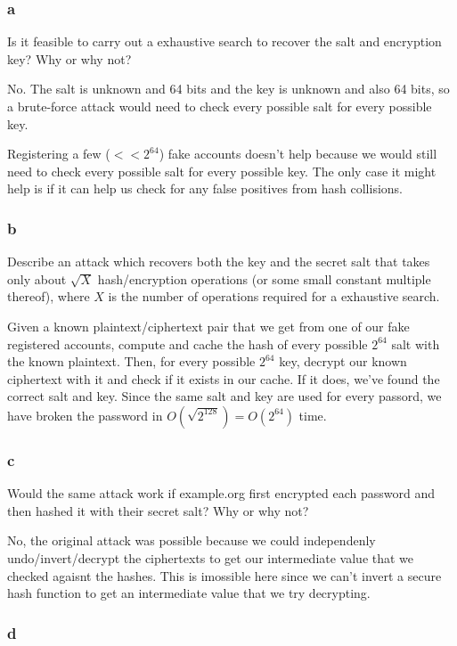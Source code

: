 \documentclass[11pt]{article}
\begin{document}
\subsubsection{a}

Is it feasible to carry out a exhaustive search to recover the salt and encryption key? Why or why not?

No. The salt is unknown and 64 bits and the key is unknown and also 64 bits, so a brute-force attack would need to check every possible salt for every possible key.

Registering a few ($<< 2^{64}$) fake accounts doesn't help because we would still need to check every possible salt for every possible key. The only case it might help is if it can help us check for any false positives from hash collisions.

\subsubsection{b}

Describe an attack which recovers both the key and the secret salt that takes only about $\sqrt{X}$ hash/encryption operations (or some small constant multiple thereof), where $X$ is the number of operations required for a exhaustive search.

Given a known plaintext/ciphertext pair that we get from one of our fake registered accounts, compute and cache the hash of every possible $2^{64}$ salt with the known plaintext. Then, for every possible $2^{64}$ key, decrypt our known ciphertext with it and check if it exists in our cache. If it does, we've found the correct salt and key. Since the same salt and key are used for every passord, we have broken the password in $O(\sqrt{2^{128}}) = O(2^{64})$ time.  

\subsubsection{c}

Would the same attack work if example.org first encrypted each password and then hashed it with their secret salt? Why or why not?

No, the original attack was possible because we could independenly undo/invert/decrypt the ciphertexts to get our intermediate value that we checked agaisnt the hashes. This is imossible here since we can't invert a secure hash function to get an intermediate value that we try decrypting.

\subsubsection{d}
\end{document}
